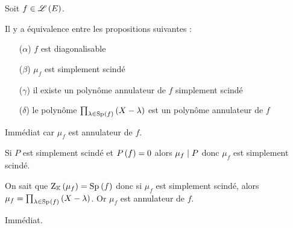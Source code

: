 \begin{theo}
Soit \(f\in\mathscr{L}\left(E\right)\).

Il y a équivalence entre les propositions suivantes :

\begin{enumerate}
    \item[(\(\alpha\))] \(f\) est diagonalisable \\
    \item[(\(\beta\))] \(\mu_f\) est simplement scindé \\
    \item[(\(\gamma\))] il existe un polynôme annulateur de \(f\) simplement scindé \\
    \item[(\(\delta\))] le polynôme \(\prod_{\lambda\in\Sp{f}}\paren{X-\lambda}\) est un polynôme annulateur de \(f\)
\end{enumerate}
\end{theo}

\begin{dem}[(\(\beta\)) \(\imp\) (\(\gamma\))]
Immédiat car \(\mu_f\) est annulateur de \(f\).
\end{dem}

\begin{dem}[(\(\gamma\)) \(\imp\) (\(\beta\))]
Si \(P\) est simplement scindé et \(P\left(f\right)=0\) alors \(\mu_f\mid P\) donc \(\mu_f\) est simplement scindé.
\end{dem}

\begin{dem}[(\(\beta\)) \(\imp\) (\(\delta\))]
On sait que \(\rac{\mu_f}=\Sp{f}\) donc si \(\mu_f\) est simplement scindé, alors \(\mu_f=\prod_{\lambda\in\Sp{f}}\paren{X-\lambda}\). Or \(\mu_f\) est annulateur de \(f\).
\end{dem}

\begin{dem}[(\(\delta\)) \(\imp\) (\(\gamma\))]
Immédiat.
\end{dem}

